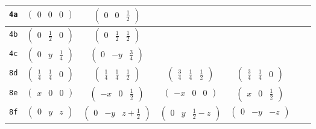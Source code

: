 \documentclass[fleqn,9pt,landscape]{jsarticle}
\begin{document}
\begin{center}
\begin{longtable}{ccccccc}
{\tt 4a} & $ \begin{pmatrix} 0 & 0 & 0 \end{pmatrix} $ & $ \begin{pmatrix} 0 & 0 & \frac{1}{2} \end{pmatrix} $ & $  $ & $  $ & $  $ & $  $ \\ \hline
{\tt 4b} & $ \begin{pmatrix} 0 & \frac{1}{2} & 0 \end{pmatrix} $ & $ \begin{pmatrix} 0 & \frac{1}{2} & \frac{1}{2} \end{pmatrix} $ & $  $ & $  $ & $  $ & $  $ \\ \hline
{\tt 4c} & $ \begin{pmatrix} 0 & y & \frac{1}{4} \end{pmatrix} $ & $ \begin{pmatrix} 0 & - y & \frac{3}{4} \end{pmatrix} $ & $  $ & $  $ & $  $ & $  $ \\ \hline
{\tt 8d} & $ \begin{pmatrix} \frac{1}{4} & \frac{1}{4} & 0 \end{pmatrix} $ & $ \begin{pmatrix} \frac{1}{4} & \frac{1}{4} & \frac{1}{2} \end{pmatrix} $ & $ \begin{pmatrix} \frac{3}{4} & \frac{1}{4} & \frac{1}{2} \end{pmatrix} $ & $ \begin{pmatrix} \frac{3}{4} & \frac{1}{4} & 0 \end{pmatrix} $ & $  $ & $  $ \\ \hline
{\tt 8e} & $ \begin{pmatrix} x & 0 & 0 \end{pmatrix} $ & $ \begin{pmatrix} - x & 0 & \frac{1}{2} \end{pmatrix} $ & $ \begin{pmatrix} - x & 0 & 0 \end{pmatrix} $ & $ \begin{pmatrix} x & 0 & \frac{1}{2} \end{pmatrix} $ & $  $ & $  $ \\ \hline
{\tt 8f} & $ \begin{pmatrix} 0 & y & z \end{pmatrix} $ & $ \begin{pmatrix} 0 & - y & z + \frac{1}{2} \end{pmatrix} $ & $ \begin{pmatrix} 0 & y & \frac{1}{2} - z \end{pmatrix} $ & $ \begin{pmatrix} 0 & - y & - z \end{pmatrix} $ & $  $ & $  $ \\ \hline

\end{longtable}
\end{center}
\end{document}
